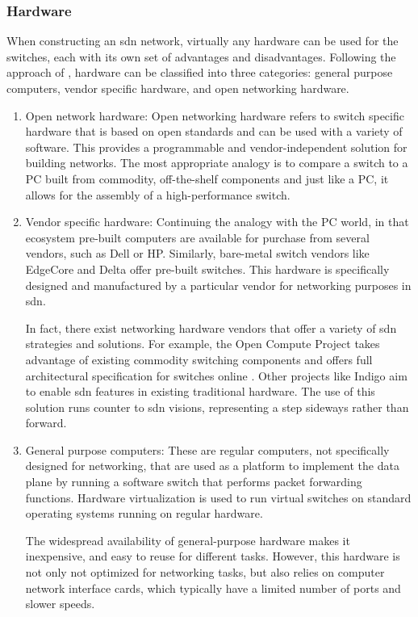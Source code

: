 \subsubsection{Hardware}
When constructing an \gls{sdn} network, virtually any hardware can be used for the switches, each with its own set of advantages and disadvantages. Following the approach of \cite{xia_survey_2015}, hardware can be classified into three categories: general purpose computers, vendor specific hardware, and open networking hardware. 



\begin{enumerate}
\item Open network hardware: 
    Open networking hardware refers to switch specific hardware that is based on open standards and can be used with a variety of software. This provides a programmable and vendor-independent solution for building networks. The most appropriate analogy is to compare a switch to a PC built from commodity, off-the-shelf components and just like a PC, it allows for the assembly of a high-performance switch\cite{peterson_software-defined_2021}. 

\item Vendor specific hardware:
    Continuing the analogy with the PC world, in that ecosystem pre-built computers are available for purchase from several vendors, such as Dell or HP. Similarly, bare-metal switch vendors like EdgeCore and Delta offer pre-built switches\cite{peterson_software-defined_2021}. This hardware is specifically designed and manufactured by a particular vendor for networking purposes in \gls{sdn}. 

    In fact, there exist networking hardware vendors that offer a variety of \gls{sdn} strategies and solutions. For example, the Open Compute Project takes advantage of existing commodity switching components and offers full architectural specification for switches online \cite{noauthor_open_nodate-1}. Other projects like Indigo\cite{noauthor_indigo_nodate} aim to enable \gls{sdn} features in existing traditional hardware. The use of this solution runs counter to \gls{sdn} visions, representing a step sideways rather than forward.

\item General purpose computers:
    These are regular computers, not specifically designed for networking, that are used as a platform to implement the data plane by running a software switch that performs packet forwarding functions. Hardware virtualization is used to run virtual switches on standard operating systems running on regular hardware.

    The widespread availability of general-purpose hardware makes it inexpensive, and easy to reuse for different tasks. However, this hardware is not only not optimized for networking tasks, but also relies on computer network interface cards, which typically have a limited number of ports and slower speeds.
\end{enumerate}

